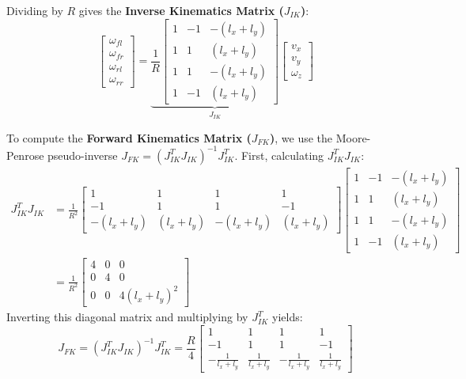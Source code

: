 \documentclass[11pt,a4paper]{article}
\begin{document}
Dividing by $R$ gives the \textbf{Inverse Kinematics Matrix ($J_{IK}$)}:
\begin{equation}
    \begin{bmatrix}
    \omega_{fl} \\ \omega_{fr} \\ \omega_{rl} \\ \omega_{rr}
    \end{bmatrix}
    =
    \underbrace{
    \frac{1}{R}
    \begin{bmatrix}
    1 & -1 & -(l_x + l_y) \\
    1 &  1 &  (l_x + l_y) \\
    1 &  1 & -(l_x + l_y) \\
    1 & -1 &  (l_x + l_y)
    \end{bmatrix}
    }_{J_{IK}}
    \begin{bmatrix}
    v_x \\ v_y \\ \omega_z
    \end{bmatrix}
\end{equation}

To compute the \textbf{Forward Kinematics Matrix ($J_{FK}$)}, we use the Moore-Penrose pseudo-inverse $J_{FK} = (J_{IK}^T J_{IK})^{-1} J_{IK}^T$. First, calculating $J_{IK}^T J_{IK}$:
\begin{align}
    J_{IK}^T J_{IK} &= \frac{1}{R^2}
    \begin{bmatrix}
    1 & 1 & 1 & 1 \\
    -1 & 1 & 1 & -1 \\
    -(l_x+l_y) & (l_x+l_y) & -(l_x+l_y) & (l_x+l_y)
    \end{bmatrix}
    \begin{bmatrix}
    1 & -1 & -(l_x + l_y) \\
    1 &  1 &  (l_x + l_y) \\
    1 &  1 & -(l_x + l_y) \\
    1 & -1 &  (l_x + l_y)
    \end{bmatrix} \nonumber \\
    &= \frac{1}{R^2}
    \begin{bmatrix}
    4 & 0 & 0 \\
    0 & 4 & 0 \\
    0 & 0 & 4(l_x + l_y)^2
    \end{bmatrix}
\end{align}
Inverting this diagonal matrix and multiplying by $J_{IK}^T$ yields:
\begin{equation}
    J_{FK} = (J_{IK}^T J_{IK})^{-1} J_{IK}^T = 
    \frac{R}{4}
    \begin{bmatrix}
    1 & 1 & 1 & 1 \\
    -1 & 1 & 1 & -1 \\
    -\frac{1}{l_x + l_y} & \frac{1}{l_x + l_y} & -\frac{1}{l_x + l_y} & \frac{1}{l_x + l_y}
    \end{bmatrix}
\end{equation}
\end{document}
